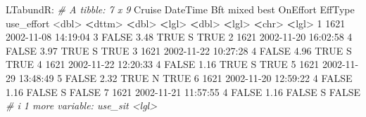 \documentclass[
]{book}
\newenvironment{Shaded}{\begin{snugshade}}{\end{snugshade}}
\newcommand{\CommentTok}[1]{\textcolor[rgb]{0.56,0.35,0.01}{\textit{#1}}}
\newcommand{\ConstantTok}[1]{\textcolor[rgb]{0.00,0.00,0.00}{#1}}
\newcommand{\DecValTok}[1]{\textcolor[rgb]{0.00,0.00,0.81}{#1}}
\newcommand{\ErrorTok}[1]{\textcolor[rgb]{0.64,0.00,0.00}{\textbf{#1}}}
\newcommand{\FloatTok}[1]{\textcolor[rgb]{0.00,0.00,0.81}{#1}}
\newcommand{\NormalTok}[1]{#1}
\newcommand{\SpecialCharTok}[1]{\textcolor[rgb]{0.00,0.00,0.00}{#1}}
\begin{document}
\begin{Shaded}
\begin{Highlighting}[]
\NormalTok{LTabundR}\SpecialCharTok{:}
\CommentTok{\# A tibble: 7 x 9}
\NormalTok{  Cruise DateTime              Bft mixed  best OnEffort EffType use\_effort}
   \SpecialCharTok{\textless{}}\NormalTok{dbl}\SpecialCharTok{\textgreater{}} \ErrorTok{\textless{}}\NormalTok{dttm}\SpecialCharTok{\textgreater{}}              \ErrorTok{\textless{}}\NormalTok{dbl}\SpecialCharTok{\textgreater{}} \ErrorTok{\textless{}}\NormalTok{lgl}\SpecialCharTok{\textgreater{}} \ErrorTok{\textless{}}\NormalTok{dbl}\SpecialCharTok{\textgreater{}} \ErrorTok{\textless{}}\NormalTok{lgl}\SpecialCharTok{\textgreater{}}    \ErrorTok{\textless{}}\NormalTok{chr}\SpecialCharTok{\textgreater{}}   \ErrorTok{\textless{}}\NormalTok{lgl}\SpecialCharTok{\textgreater{}}     
\DecValTok{1}   \DecValTok{1621} \DecValTok{2002{-}11{-}08} \DecValTok{14}\SpecialCharTok{:}\DecValTok{19}\SpecialCharTok{:}\DecValTok{04}     \DecValTok{3} \ConstantTok{FALSE}  \FloatTok{3.48} \ConstantTok{TRUE}\NormalTok{     S       }\ConstantTok{TRUE}      
\DecValTok{2}   \DecValTok{1621} \DecValTok{2002{-}11{-}20} \DecValTok{16}\SpecialCharTok{:}\DecValTok{02}\SpecialCharTok{:}\DecValTok{58}     \DecValTok{4} \ConstantTok{FALSE}  \FloatTok{3.97} \ConstantTok{TRUE}\NormalTok{     S       }\ConstantTok{TRUE}      
\DecValTok{3}   \DecValTok{1621} \DecValTok{2002{-}11{-}22} \DecValTok{10}\SpecialCharTok{:}\DecValTok{27}\SpecialCharTok{:}\DecValTok{28}     \DecValTok{4} \ConstantTok{FALSE}  \FloatTok{4.96} \ConstantTok{TRUE}\NormalTok{     S       }\ConstantTok{TRUE}      
\DecValTok{4}   \DecValTok{1621} \DecValTok{2002{-}11{-}22} \DecValTok{12}\SpecialCharTok{:}\DecValTok{20}\SpecialCharTok{:}\DecValTok{33}     \DecValTok{4} \ConstantTok{FALSE}  \FloatTok{1.16} \ConstantTok{TRUE}\NormalTok{     S       }\ConstantTok{TRUE}      
\DecValTok{5}   \DecValTok{1621} \DecValTok{2002{-}11{-}29} \DecValTok{13}\SpecialCharTok{:}\DecValTok{48}\SpecialCharTok{:}\DecValTok{49}     \DecValTok{5} \ConstantTok{FALSE}  \FloatTok{2.32} \ConstantTok{TRUE}\NormalTok{     N       }\ConstantTok{TRUE}      
\DecValTok{6}   \DecValTok{1621} \DecValTok{2002{-}11{-}20} \DecValTok{12}\SpecialCharTok{:}\DecValTok{59}\SpecialCharTok{:}\DecValTok{22}     \DecValTok{4} \ConstantTok{FALSE}  \FloatTok{1.16} \ConstantTok{FALSE}\NormalTok{    S       }\ConstantTok{FALSE}     
\DecValTok{7}   \DecValTok{1621} \DecValTok{2002{-}11{-}21} \DecValTok{11}\SpecialCharTok{:}\DecValTok{57}\SpecialCharTok{:}\DecValTok{55}     \DecValTok{4} \ConstantTok{FALSE}  \FloatTok{1.16} \ConstantTok{FALSE}\NormalTok{    S       }\ConstantTok{FALSE}     
\CommentTok{\# i 1 more variable: use\_sit \textless{}lgl\textgreater{}}
\end{Highlighting}
\end{Shaded}
\end{document}
